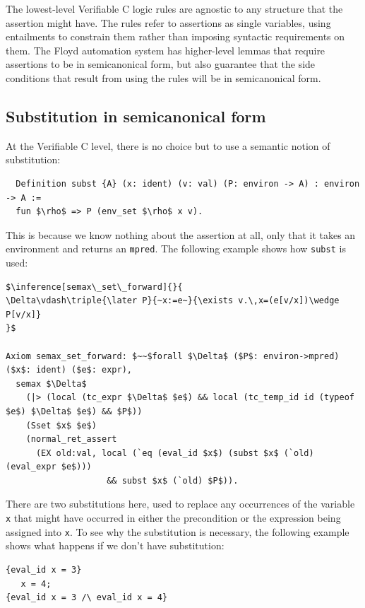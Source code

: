 \documentclass{puthesis}
\begin{document}
The lowest-level Verifiable C logic rules are agnostic to any
structure that the assertion might have. The rules refer to
assertions as single variables, using entailments to constrain them
rather than imposing syntactic requirements on them. The Floyd
automation system has higher-level lemmas that require assertions
to be in semicanonical form, but also guarantee that the side
conditions that result from using the rules will be in semicanonical
form.

\subsection{Substitution in semicanonical form}

At the Verifiable C level, there is no choice but to use a semantic
notion of substitution:

\begin{lstlisting}
  Definition subst {A} (x: ident) (v: val) (P: environ -> A) : environ -> A :=
  fun $\rho$ => P (env_set $\rho$ x v).
\end{lstlisting}

This is because we know nothing about the assertion at all, only that
it takes an environment and returns an \lstinline|mpred|. The following example
shows how \lstinline|subst| is used:

\begin{lstlisting}
$\inference[semax\_set\_forward]{}{
\Delta\vdash\triple{\later P}{~x:=e~}{\exists v.\,x=(e[v/x])\wedge P[v/x]}
}$

Axiom semax_set_forward: $~~$forall $\Delta$ ($P$: environ->mpred) ($x$: ident) ($e$: expr),
  semax $\Delta$
    (|> (local (tc_expr $\Delta$ $e$) && local (tc_temp_id id (typeof $e$) $\Delta$ $e$) && $P$))
    (Sset $x$ $e$) 
    (normal_ret_assert 
      (EX old:val, local (`eq (eval_id $x$) (subst $x$ (`old) (eval_expr $e$)))
                    && subst $x$ (`old) $P$)).
\end{lstlisting}

There are two substitutions here, used to replace any occurrences of
the variable \lstinline|x| that might have occurred in either the
precondition or the expression being assigned into \lstinline|x|. To
see why the substitution is necessary, the following example shows
what happens if we don't have substitution:

\begin{verbatim}
{eval_id x = 3}
   x = 4;
{eval_id x = 3 /\ eval_id x = 4}
\end{verbatim}
\end{document}
